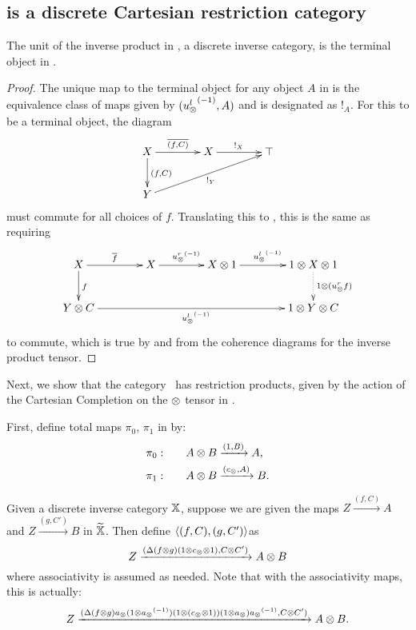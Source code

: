 \subsection{\hypXt is a discrete Cartesian restriction category} %
\label{sec:the_category_hypxt_is_cartesian}



\begin{lemma}\label{lem:tensor_unit_of_x_is_terminal_object_of_xt}
  The unit of the inverse product in \X, a discrete inverse category,  is the terminal object in \Xt.
\end{lemma}
\begin{proof}
  The unique map to the terminal object for any object $A$ in \Xt is the equivalence class of maps
  given by $({u_{\otimes}^l}^{(-1)},A)$ and is designated as $!_A$. For this to be a terminal object, the diagram
  \[
    \xymatrix @C=40pt @R=25pt{
      X \ar[r]^{\restr{(f,C)}} \ar[d]^{(f,C)} & X \ar[r]^{!_X}  &\top  \\
      Y \ar[urr]_{!_Y}
    }
  \]
  must commute for all choices of $f$. Translating this to \X, this is the same as requiring
  \[
    \xymatrix @C=40pt @R=25pt{
      X \ar[r]^{\restr{f}} \ar[d]^{f} & X \ar[r]^{\inv{\usr} }
      & X\*1 \ar[r]^{\inv{\usl}}  &1\*X\*1 \ar@{.>}[d]^{1\*(\usr f)}  \\
      Y \*C\ar[rrr]_{\inv{\usl}} & & & 1 \*Y \* C
    }
  \]
  to commute, which is true by \rone and from the coherence diagrams for the inverse product tensor.
\end{proof}

Next, we show that the category \Xt\ has restriction products, given by the action of the Cartesian
Completion on the $\otimes$ tensor in \X.

First, define total maps $\pi_0$, $\pi_1$ in \Xt by:
\begin{align}
  \pi_0:\qquad & A \otimes B \xrightarrow{(1,B)} A, \label{eq:defn:pia}\\
  \pi_1:\qquad & A \otimes B \xrightarrow{(c_{\otimes},A)} B. \label{eq:defn:pib}
\end{align}

\begin{definition}\label{def:product_map_in_xt}
  Given a discrete inverse category $\mathbb{X}$, suppose we are given the maps $ Z \xrightarrow{(f,C)} A$
  and $Z \xrightarrow{(g,C')} B$ in $\widetilde{\mathbb{X}}$. Then define $\langle(f,C),(g,C')\rangle$as
  \begin{equation}
    Z\xrightarrow{(\Delta  ( f \otimes g )  (1\otimes c_{\otimes} \otimes 1), C\otimes C')} A \otimes B\label{eq:defn:fg}
  \end{equation}
  where associativity is assumed as needed. Note that with the associativity maps, this is actually:
  \begin{equation}
    Z\xrightarrow{(\Delta  ( f \otimes g )  a_{\otimes} (1\otimes{a_{\otimes}}^{(-1)})
      (1\otimes (c_{\otimes} \otimes 1)) (1\otimes a_{\otimes}) {a_{\otimes}}^{(-1)}, C\otimes C')} A \otimes B.\label{eq:defn:fg2}
  \end{equation}
\end{definition}


